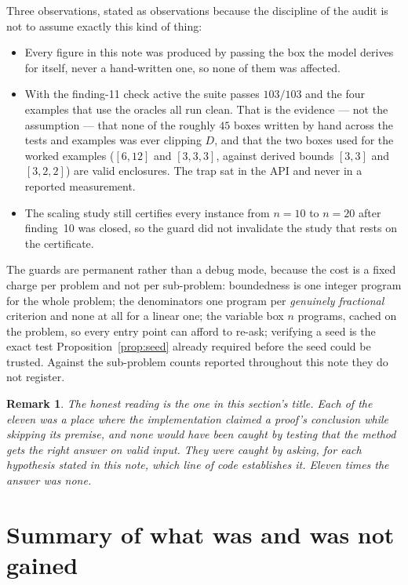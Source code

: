 \documentclass[11pt,a4paper]{article}
\newtheorem{remark}{Remark}
\newcommand{\Dset}{D}
\begin{document}
Three observations, stated as observations because the discipline of the audit
is not to assume exactly this kind of thing:

\begin{itemize}
\itemsep2pt
\item Every figure in this note was produced by passing the box the model
      derives for itself, never a hand-written one, so none of them was
      affected.
\item With the finding-11 check active the suite passes $103/103$ and the four
      examples that use the oracles all run clean. That is the evidence --- not
      the assumption --- that none of the roughly $45$ boxes written by hand
      across the tests and examples was ever clipping $\Dset$, and that the two
      boxes used for the worked examples ($[6,12]$ and $[3,3,3]$, against
      derived bounds $[3,3]$ and $[3,2,2]$) are valid enclosures. The trap sat
      in the API and never in a reported measurement.
\item The scaling study still certifies every instance from $n = 10$ to
      $n = 20$ after finding~10 was closed, so the guard did not invalidate the
      study that rests on the certificate.
\end{itemize}

\noindent
The guards are permanent rather than a debug mode, because the cost is a fixed
charge per problem and not per sub-problem: boundedness is one integer program
for the whole problem; the denominators one program per \emph{genuinely
fractional} criterion and none at all for a linear one; the variable box $n$
programs, cached on the problem, so every entry point can afford to re-ask;
verifying a seed is the exact test Proposition~\ref{prop:seed} already required
before the seed could be trusted. Against the sub-problem counts reported
throughout this note they do not register.

\begin{remark}
The honest reading is the one in this section's title. Each of the eleven was a
place where the implementation claimed a proof's conclusion while skipping its
premise, and none would have been caught by testing that the method gets the
right answer on valid input. They were caught by asking, for each hypothesis
stated in this note, which line of code establishes it. Eleven times the answer
was none.
\end{remark}

\section{Summary of what was and was not gained}
\end{document}
